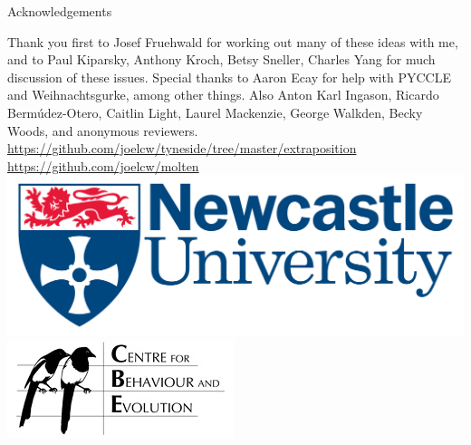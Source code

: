 \documentclass[hyperref={pdfpagelabels=false}]{beamer}
\begin{document}


\begin{frame}{Acknowledgements}
\begin{center}
Thank you first to Josef Fruehwald for working out many of these ideas with me, and to Paul Kiparsky, Anthony Kroch, Betsy Sneller, Charles Yang for much discussion of these issues. Special thanks to Aaron Ecay for help with PYCCLE and Weihnachtsgurke, among other things. Also Anton Karl Ingason, Ricardo Bermúdez-Otero, Caitlin Light, Laurel Mackenzie, George Walkden, Becky Woods, and anonymous reviewers.
\vspace{5mm}\\
\url{https://github.com/joelcw/tyneside/tree/master/extraposition}\\\url{https://github.com/joelcw/molten}\\\vspace{3mm}
\includegraphics[scale = 0.1]{ncllogo.jpg} \includegraphics[scale = 0.4]{cbelogo.jpg} 
\end{center}
\end{frame}
\end{document}
